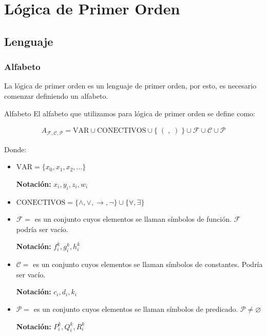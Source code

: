 \chapter{Lógica de Primer Orden}
\graphicspath{ {./teoria/resources/logica-primer-orden/} }

\section{Lenguaje}

\subsection{Alfabeto}
La lógica de primer orden es un lenguaje de primer orden, por esto, es 
necesario comenzar definiendo un alfabeto.

\begin{definicion}{Alfabeto}{}
    El alfabeto que utilizamos para lógica de primer orden se define como:

    \begin{gather*}
        A_{\mathcal{F}, \mathcal{C}, \mathcal{P}} = 
        \mathrm{VAR} \cup \mathrm{ CONECTIVOS } \cup \{\;(\;,\; )\;\} \cup \mathcal{F}
        \cup \mathcal{C} \cup \mathcal{P}
    \end{gather*}

    \medskip

    Donde:
    
    \begin{itemize}
    \item $\mathrm{VAR} = \{ x_0, x_1, x_2, \dots \}$

    \bigskip
    \textbf{Notación:}
    $x_i, y_i, z_i, w_i$

    \item $\mathrm{CONECTIVOS } = \{ \wedge,\vee,\to,\neg \} \cup 
        \{ \forall, \exists \}$

    \item $\mathcal{F} =$ es un conjunto cuyos elementos se llaman símbolos de 
    función. 
    $\mathcal{F}$ podría ser vacío.

    \bigskip
    \textbf{Notación:}
    $f_i^k, g_i^k, h_i^k$

    \item $\mathcal{C} = $ es un conjunto cuyos elementos se llaman símbolos de
    constantes.
    Podría ser vacío.

    \bigskip
    \textbf{Notación:}
    $c_i, d_i, k_i$

    \item $\mathcal{P} = $ es un conjunto cuyos elementos se llaman símbolos de
    predicado. $\mathcal{P} \neq \varnothing$

    \bigskip
    \textbf{Notación:}
    $P_i^k, Q_i^k, R_i^k$
    \end{itemize}
\end{definicion}

